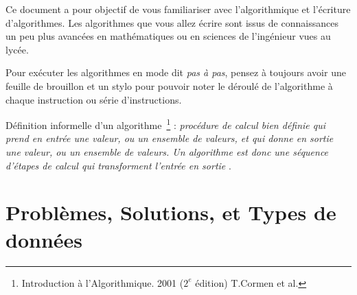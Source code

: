 \documentclass[11pt,a4paper]{article}
\begin{document}
\EncadreTitre

\bigskip


%
%

\bigskip


Ce document a pour objectif de vous familiariser avec l'algorithmique et l'écriture d'algorithmes.
Les algorithmes que vous allez écrire sont issus de connaissances un peu plus avancées en mathématiques ou en sciences de l'ingénieur vues au lycée.

Pour exécuter les algorithmes en mode dit \textit{pas à pas}, pensez à toujours avoir une feuille de brouillon et un stylo pour pouvoir noter le déroulé de l'algorithme à chaque instruction ou série d'instructions.

\bigskip

Définition informelle d'un algorithme~\footnote{Introduction à l'Algorithmique. 2001 ($2^{e}$ édition) T.Cormen et al.} : \og \textit{procédure de calcul bien définie qui prend en entrée une valeur, ou un ensemble de valeurs, et qui donne en sortie une valeur, ou un ensemble de valeurs. Un algorithme est donc une séquence d'étapes de calcul qui transforment l'entrée en sortie} \fg .

\bigskip


\section{Problèmes, Solutions, et Types de données}
\end{document}

